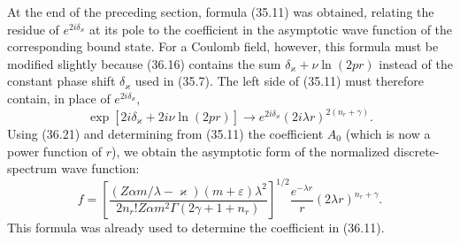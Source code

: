 At the end of the preceding section, formula (35.11) was obtained, relating the residue of $e^{2i\delta_\varkappa}$ at its pole to the coefficient in the asymptotic wave function of the corresponding bound state. For a Coulomb field, however, this formula must be modified slightly because (36.16) contains the sum $\delta_\varkappa+\nu\ln(2pr)$ instead of the constant phase shift $\delta_\varkappa$ used in (35.7). The left side of (35.11) must therefore contain, in place of $e^{2i\delta_\varkappa}$,
\[
\exp[2i\delta_\varkappa+2i\nu\ln(2pr)]
\to e^{2i\delta_\varkappa}(2i\lambda r)^{2(n_r+\gamma)}.
\]
Using (36.21) and determining from (35.11) the coefficient $A_0$ (which is now a power function of $r$), we obtain the asymptotic form of the normalized discrete-spectrum wave function:
\begin{equation}
f=\left[\frac{(Z\alpha m/\lambda-\varkappa)(m+\varepsilon)\lambda^2}
{2n_r!Z\alpha m^2\Gamma(2\gamma+1+n_r)}\right]^{1/2}
\frac{e^{-\lambda r}}r(2\lambda r)^{n_r+\gamma}.
\tag{36.22}
\end{equation}
This formula was already used to determine the coefficient in (36.11).
